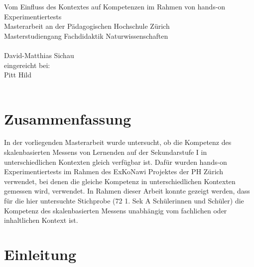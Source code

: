 \documentclass[12pt,oneside, DIV11]{scrbook}
\begin{document}
\frontmatter

\begin{titlepage}
	\vspace*{2cm}
	\begin{center}
		{\LARGE Vom Einfluss des Kontextes auf Kompetenzen im Rahmen von hands-on Experimentiertests
		 \vspace*{2cm}\\ Masterarbeit an der Pädagogischen Hochschule Zürich\vspace*{1cm}\\Masterstudiengang Fachdidaktik Naturwissenschaften\\}
		\vspace*{2cm}{\normalsize vorgelegt von:}\\ \large David-Matthias Sichau \\
		\vspace*{1.5cm} {\normalsize  eingereicht bei:}\\ \large Pitt Hild \\
		\vspace*{2cm}{\large 05. Februar 2015, Zürich}\\
	\end{center}
\end{titlepage}



\frontmatter 
\tableofcontents



\chapter*{Zusammenfassung}

In der vorliegenden Masterarbeit wurde untersucht, ob die Kompetenz des skalenbasierten Messens von Lernenden auf der Sekundarstufe I in unterschiedlichen Kontexten gleich verfügbar ist. Dafür wurden hands-on Experimentiertests im Rahmen des ExKoNawi Projektes der PH Zürich verwendet, bei denen die gleiche Kompetenz in unterschiedlichen Kontexten gemessen wird, verwendet. In Rahmen dieser Arbeit konnte gezeigt werden, dass für die hier untersuchte Stichprobe (72 1. Sek A Schülerinnen und Schüler) die Kompetenz des skalenbasierten Messens unabhängig vom fachlichen oder inhaltlichen Kontext ist.





\mainmatter


\chapter{Einleitung}

\end{document}
